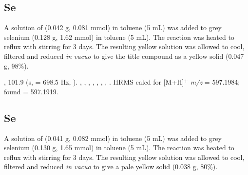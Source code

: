 
\subsection*{\tBuThixantphos{}Se}

A solution of \tButhixantphos{} (0.042 g, 0.081 mmol) in toluene (5 mL) was added to grey selenium (0.128 g, 1.62 mmol) in toluene (5 mL).  The reaction was heated to reflux with stirring for 3 days.  The resulting yellow solution was allowed to cool, filtered and reduced \emph{in vacuo} to give the title compound as a yellow solid (0.047 g, 98\%).   

,
101.9 (s, \JPSe{} = 698.5 Hz, ).
,
,
,
,
,
,
,
.
HRMS calcd for  [M+H]$^+$ \emph{m/z} = 597.1984; found = 597.1919.


\subsection*{\tBuXantphos{}Se}


A solution of \tBuxantphos{} (0.041 g, 0.082 mmol) in toluene (5 mL) was added to grey selenium (0.130 g, 1.65 mmol) in toluene (5 mL).  The reaction was heated to reflux with stirring for 3 days.  The resulting yellow solution was allowed to cool, filtered and reduced \emph{in vacuo} to give a pale yellow solid (0.038 g, 80\%).    

